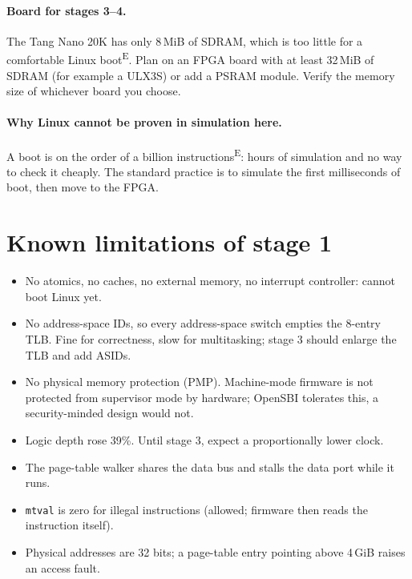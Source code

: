 \documentclass[10pt,a4paper]{article}
\newcommand{\code}[1]{\texttt{#1}}
\newcommand{\est}{\textsuperscript{E}}
\begin{document}
\paragraph{Board for stages 3--4.} The Tang Nano 20K has only 8\,MiB of SDRAM, which is too little for a comfortable Linux boot\est. Plan on an FPGA board with at least 32\,MiB of SDRAM (for example a ULX3S) or add a PSRAM module. Verify the memory size of whichever board you choose.
\paragraph{Why Linux cannot be proven in simulation here.} A boot is on the order of a billion instructions\est: hours of simulation and no way to check it cheaply. The standard practice is to simulate the first milliseconds of boot, then move to the FPGA.

\section{Known limitations of stage 1}
\begin{itemize}
\item No atomics, no caches, no external memory, no interrupt controller: cannot boot Linux yet.
\item No address-space IDs, so every address-space switch empties the 8-entry TLB. Fine for correctness, slow for multitasking; stage 3 should enlarge the TLB and add ASIDs.
\item No physical memory protection (PMP). Machine-mode firmware is not protected from supervisor mode by hardware; OpenSBI tolerates this, a security-minded design would not.
\item Logic depth rose 39\%. Until stage 3, expect a proportionally lower clock.
\item The page-table walker shares the data bus and stalls the data port while it runs.
\item \code{mtval} is zero for illegal instructions (allowed; firmware then reads the instruction itself).
\item Physical addresses are 32 bits; a page-table entry pointing above 4\,GiB raises an access fault.
\end{itemize}
\end{document}
